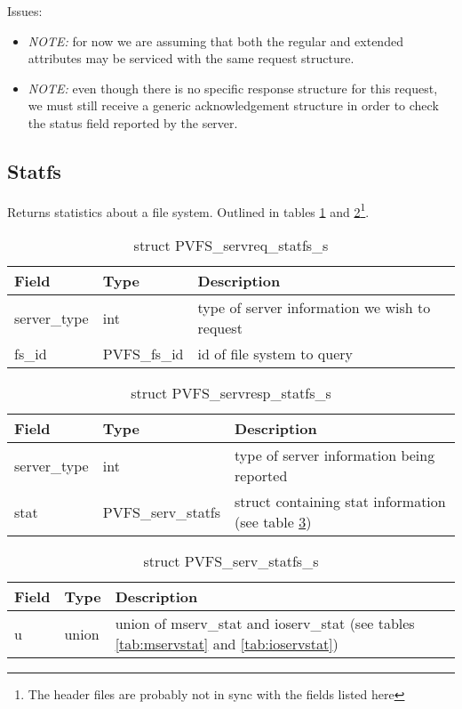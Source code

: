 \documentclass[11pt, letterpaper]{article} %
\begin{document}
Issues:
\begin{itemize}
\item \emph{NOTE:} for now we are assuming that both the regular and
extended attributes may be serviced with the same request structure.
\item \emph{NOTE:} even though there is no specific response structure
for this request, we must still receive a generic acknowledgement
structure in order to check the status field reported by the server.
\end{itemize}

\subsection{Statfs}

Returns statistics about a file system.  Outlined in tables
\ref{tab:reqstatfs} and \ref{tab:respstatfs}\footnote{The header files are
probably not in sync with the fields listed here}.

\begin{table}[H]
\begin{tabular}{|l|l|l|}
\hline
Field & Type & Description \\
\hline
\hline
server\_type & int & type of server information we wish to request\\
\hline
fs\_id & PVFS\_fs\_id & id of file system to query\\
\hline
\end{tabular}
\caption{struct PVFS\_servreq\_statfs\_s \label{tab:reqstatfs}}
\end{table}

\begin{table}[H]
\begin{tabular}{|l|l|l|}
\hline
Field & Type & Description \\
\hline
\hline
server\_type & int & type of server information being reported\\
\hline
stat & PVFS\_serv\_statfs & struct containing stat information (see
table \ref{tab:servstatfs})\\
\hline
\end{tabular}
\caption{struct PVFS\_servresp\_statfs\_s \label{tab:respstatfs}}
\end{table}

\begin{table}[H]
\begin{tabular}{|l|l|l|}
\hline
Field & Type & Description \\
\hline
\hline
u & union & union of mserv\_stat and ioserv\_stat (see tables
\ref{tab:mservstat} and \ref{tab:ioservstat})\\
\hline
\end{tabular}
\caption{struct PVFS\_serv\_statfs\_s \label{tab:servstatfs}}
\end{table}
\end{document}
